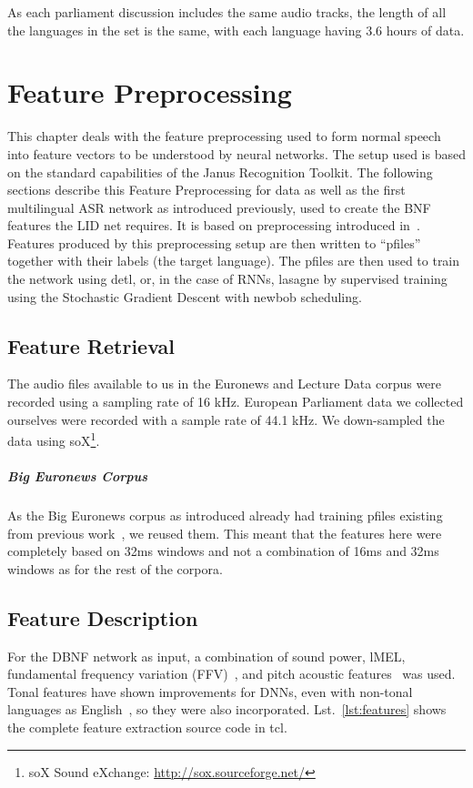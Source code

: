 As each parliament discussion includes the same audio tracks, the length of all the languages in the set is the same, with each language having 3.6 hours of data. 

\chapter{Feature Preprocessing}
\label{ch:FP}

This chapter deals with the feature preprocessing used to form normal speech into feature vectors to be understood by neural networks. The setup used is based on the standard capabilities of the Janus Recognition Toolkit. The following sections describe this Feature Preprocessing for data as well as the first multilingual ASR network as introduced previously, used to create the BNF features the LID net requires.  It is based on preprocessing introduced in~\cite{Mueller2016b}.
Features produced by this preprocessing setup are then written to ``pfiles'' together with their labels (the target language). The pfiles are then used to train the network using detl, or, in the case of RNNs, lasagne by supervised training using the Stochastic Gradient Descent with newbob scheduling.

\section{Feature Retrieval}
\label{sec:FP:FA}
The audio files available to us in the Euronews and Lecture Data corpus were recorded using a sampling rate of 16 kHz. European Parliament data we collected ourselves were recorded with a sample rate of 44.1 kHz. We down-sampled the data using soX\footnote{soX Sound eXchange: \url{http://sox.sourceforge.net/}}. 
\paragraph{Big Euronews Corpus} As the Big Euronews corpus as introduced already had training pfiles existing from previous work~\cite{Mueller2016b}, we reused them. This meant that the features here were completely based on 32ms windows and not a combination of 16ms and 32ms windows as for the rest of the corpora.

\section{Feature Description}
\label{sec:FP:FD}
For the DBNF network as input, a combination of sound power, lMEL, fundamental frequency variation (FFV)~\cite{laskowski2008fundamental}, \cite{laskowski2008fundamental} and pitch acoustic features~\cite{schubert1999grundfrequenzverfolgung} was used. Tonal features have shown improvements for DNNs, even with non-tonal languages as English~\cite{metze2013models}, so they were also incorporated. Lst.~\ref{lst:features} shows the complete feature extraction source code in tcl.

